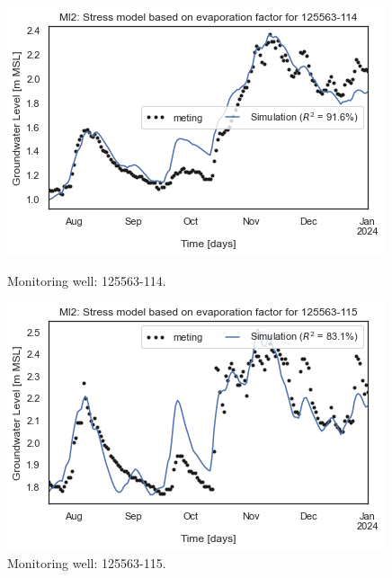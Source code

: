 \begin{figure}[htbp]
    \centering
    \begin{minipage}{0.32\textwidth}
        \centering
        \includegraphics[width=\linewidth]{frontmatter/Heijplaat-fig/125563-114.png}
        \caption{Monitoring well: 125563-114.}
        \label{SM: 125563-114}
    \end{minipage}
    \hfill
    \begin{minipage}{0.32\textwidth}
        \centering
        \includegraphics[width=\linewidth]{frontmatter/Heijplaat-fig/125563-115.png}
        \caption{Monitoring well: 125563-115.}
        \label{SM: 125563-115}
    \end{minipage}
    \hfill
    \begin{minipage}{0.32\textwidth}
        \centering

\end{minipage}
\end{figure}
